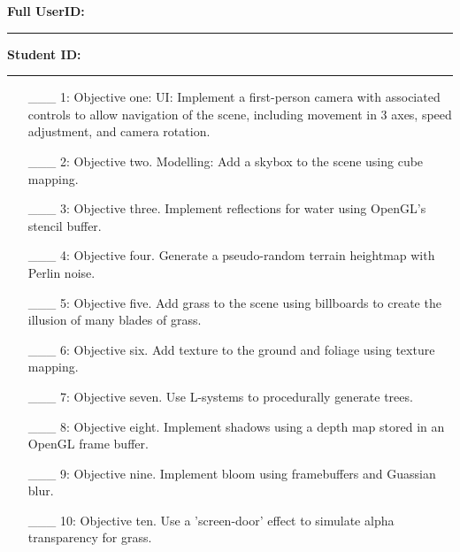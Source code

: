 \documentclass {article}
\begin{document}

{\hfill{\bf Full UserID:\rule{2in}{.1mm}}\hfill{\bf Student ID:\rule{2in}{.1mm}}\hfill}

\begin{enumerate}
     \item[\_\_\_ 1:]  Objective one: UI: Implement a first-person camera with associated controls to allow navigation of the scene, including movement in 3 axes, speed adjustment, and camera rotation.

     \item[\_\_\_ 2:]  Objective two. Modelling: Add a skybox to the scene using cube mapping.

     \item[\_\_\_ 3:]  Objective three. Implement reflections for water using OpenGL's stencil buffer.

     \item[\_\_\_ 4:]  Objective four. Generate a pseudo-random terrain heightmap with Perlin noise.

     \item[\_\_\_ 5:]  Objective five. Add grass to the scene using billboards to create the illusion of many blades of grass.

     \item[\_\_\_ 6:]  Objective six. Add texture to the ground and foliage using texture mapping.

     \item[\_\_\_ 7:]  Objective seven. Use L-systems to procedurally generate trees.

     \item[\_\_\_ 8:]  Objective eight. Implement shadows using a depth map stored in an OpenGL frame buffer.

     \item[\_\_\_ 9:]  Objective nine. Implement bloom using framebuffers and Guassian blur.

     \item[\_\_\_ 10:]  Objective ten. Use a 'screen-door' effect to simulate alpha transparency for grass.
\end{enumerate}


\end{document}
